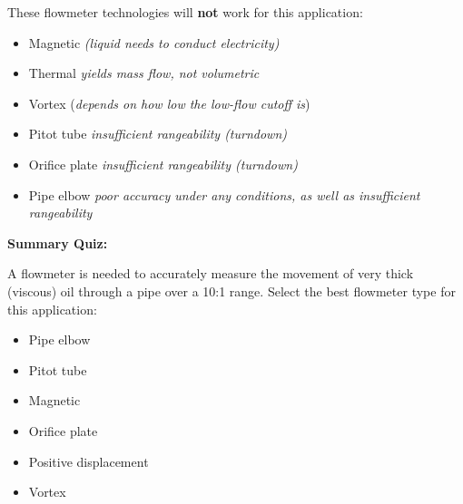\vskip 10pt

\noindent
These flowmeter technologies will {\bf not} work for this application:

\begin{itemize}
\item{} Magnetic {\it (liquid needs to conduct electricity)}
\item{} Thermal {\it yields mass flow, not volumetric}
\item{} Vortex ({\it depends on how low the low-flow cutoff is})
\item{} Pitot tube {\it insufficient rangeability (turndown)}
\item{} Orifice plate {\it insufficient rangeability (turndown)}
\item{} Pipe elbow {\it poor accuracy under any conditions, as well as insufficient rangeability}
\end{itemize}

\vfil \eject

\noindent
{\bf Summary Quiz:}

A flowmeter is needed to accurately measure the movement of very thick (viscous) oil through a pipe over a 10:1 range.  Select the best flowmeter type for this application:

\begin{itemize}
\item{} Pipe elbow
\vskip 5pt 
\item{} Pitot tube
\vskip 5pt 
\item{} Magnetic
\vskip 5pt 
\item{} Orifice plate
\vskip 5pt 
\item{} Positive displacement
\vskip 5pt 
\item{} Vortex
\end{itemize}





